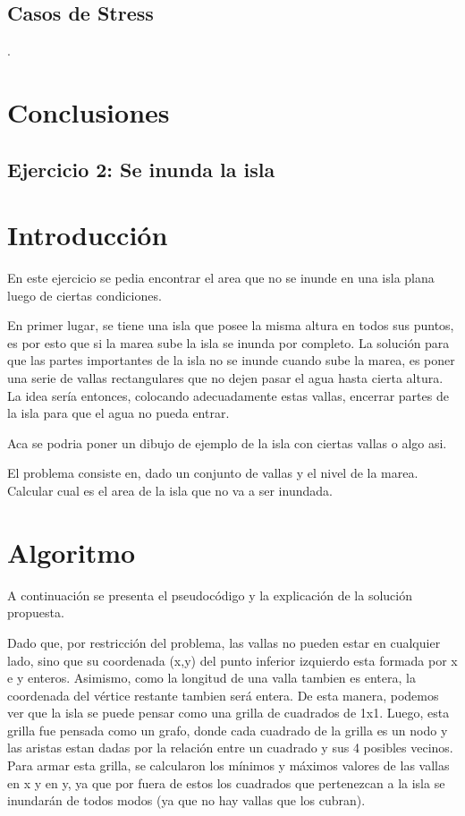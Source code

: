 \documentclass[a4paper, 12pt]{article}
\begin{document}
\subsection*{Casos de Stress}.

\section*{Conclusiones}


\begin{center}
\item \section*{Ejercicio 2: Se inunda la isla}
\end{center}

\section*{Introducci\'on}
En este ejercicio se pedia encontrar el area que no se inunde en una isla plana luego de ciertas condiciones.

En primer lugar, se tiene una isla que posee la misma altura en todos sus puntos, es por esto que si la marea sube la isla se inunda por completo. La soluci\'on para que las partes importantes de la isla no se inunde cuando sube la marea, es poner una serie de vallas rectangulares que no dejen pasar el agua hasta cierta altura. La idea ser\'ia entonces, colocando adecuadamente estas vallas, encerrar partes de la isla para que el agua no pueda entrar.

Aca se podria poner un dibujo de ejemplo de la isla con ciertas vallas o algo asi.

El problema consiste en, dado un conjunto de vallas y el nivel de la marea. Calcular cual es el area de la isla que no va a ser inundada.

\section*{Algoritmo}
A continuaci\'on se presenta el pseudoc\'odigo y la explicaci\'on de la soluci\'on propuesta. 


Dado que, por restricci\'on del problema, las vallas no pueden estar en cualquier lado, sino que su coordenada (x,y) del punto inferior izquierdo esta formada por x e y enteros. Asimismo, como la longitud de una valla tambien es entera, la coordenada del v\'ertice restante tambien ser\'a entera. De esta manera, podemos ver que la isla se puede pensar como una grilla de cuadrados de 1x1. Luego, esta grilla fue pensada como un grafo, donde cada cuadrado de la grilla es un nodo y las aristas estan dadas por la relaci\'on entre un cuadrado y sus 4 posibles vecinos. Para armar esta grilla, se calcularon los m\'inimos y m\'aximos valores de las vallas en x y en y, ya que por fuera de estos los cuadrados que pertenezcan a la isla se inundar\'an de todos modos (ya que no hay vallas que los cubran).
\end{document}
